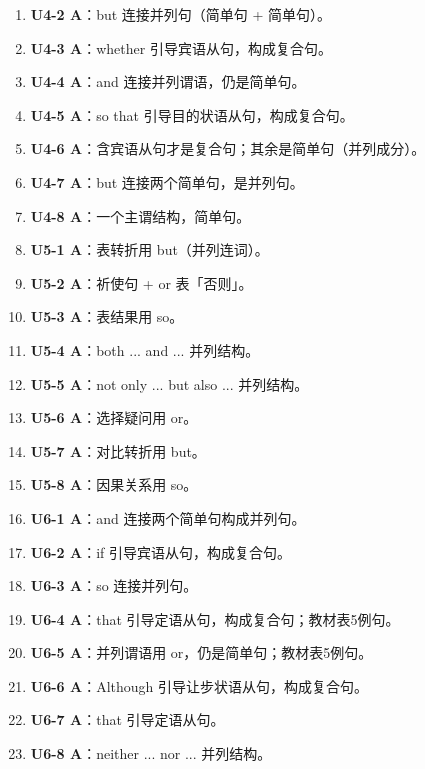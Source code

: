 \documentclass[11pt,a4paper]{ctexart}
\begin{document}
\begin{enumerate}[leftmargin=1.6em,itemsep=2pt]
\item \textbf{U4-2 A}：but 连接并列句（简单句 + 简单句）。
\item \textbf{U4-3 A}：whether 引导宾语从句，构成复合句。
\item \textbf{U4-4 A}：and 连接并列谓语，仍是简单句。
\item \textbf{U4-5 A}：so that 引导目的状语从句，构成复合句。
\item \textbf{U4-6 A}：含宾语从句才是复合句；其余是简单句（并列成分）。
\item \textbf{U4-7 A}：but 连接两个简单句，是并列句。
\item \textbf{U4-8 A}：一个主谓结构，简单句。
\item \textbf{U5-1 A}：表转折用 but（并列连词）。
\item \textbf{U5-2 A}：祈使句 + or 表「否则」。
\item \textbf{U5-3 A}：表结果用 so。
\item \textbf{U5-4 A}：both ... and ... 并列结构。
\item \textbf{U5-5 A}：not only ... but also ... 并列结构。
\item \textbf{U5-6 A}：选择疑问用 or。
\item \textbf{U5-7 A}：对比转折用 but。
\item \textbf{U5-8 A}：因果关系用 so。
\item \textbf{U6-1 A}：and 连接两个简单句构成并列句。
\item \textbf{U6-2 A}：if 引导宾语从句，构成复合句。
\item \textbf{U6-3 A}：so 连接并列句。
\item \textbf{U6-4 A}：that 引导定语从句，构成复合句；教材表5例句。
\item \textbf{U6-5 A}：并列谓语用 or，仍是简单句；教材表5例句。
\item \textbf{U6-6 A}：Although 引导让步状语从句，构成复合句。
\item \textbf{U6-7 A}：that 引导定语从句。
\item \textbf{U6-8 A}：neither ... nor ... 并列结构。
\end{enumerate}
\end{document}

